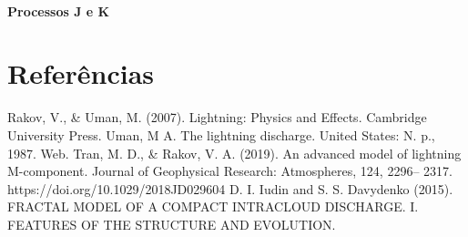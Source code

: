\documentclass[a4paper, 12pt, onecolumn,singlespacing]{article}
\begin{document}
	\paragraph{Processos J e K}
	
	
	
	\section{Referências}
	\begin{thebibliography}{99}
		 Rakov, V., \& Uman, M. (2007). Lightning: Physics and Effects. Cambridge University Press.		
		  Uman, M A. The lightning discharge. United States: N. p., 1987. Web. 
		  Tran, M. D., \& Rakov, V. A. (2019). An advanced model of lightning M-component. Journal of Geophysical Research: Atmospheres, 124, 2296– 2317. https://doi.org/10.1029/2018JD029604 
		 D. I. Iudin and S. S. Davydenko (2015). FRACTAL MODEL OF A COMPACT INTRACLOUD DISCHARGE. I. FEATURES OF THE STRUCTURE AND EVOLUTION.
	\end{thebibliography}
\end{document}
